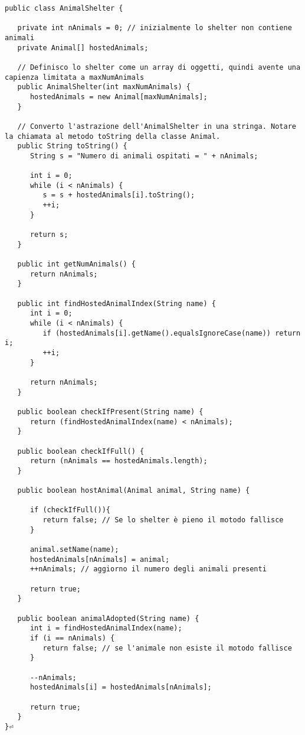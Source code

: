 \documentclass{article}
\begin{document}
\begin{lstlisting}[caption={AnimalShelter.java}]
	public class AnimalShelter {

   private int nAnimals = 0; // inizialmente lo shelter non contiene animali
   private Animal[] hostedAnimals;

   // Definisco lo shelter come un array di oggetti, quindi avente una capienza limitata a maxNumAnimals
   public AnimalShelter(int maxNumAnimals) {
      hostedAnimals = new Animal[maxNumAnimals];
   }

   // Converto l'astrazione dell'AnimalShelter in una stringa. Notare la chiamata al metodo toString della classe Animal.
   public String toString() {
      String s = "Numero di animali ospitati = " + nAnimals;

      int i = 0;
      while (i < nAnimals) {
         s = s + hostedAnimals[i].toString();
         ++i;
      }

      return s;
   }

   public int getNumAnimals() {
      return nAnimals;
   }

   public int findHostedAnimalIndex(String name) {
      int i = 0;
      while (i < nAnimals) {
         if (hostedAnimals[i].getName().equalsIgnoreCase(name)) return i;
         ++i;
      }

      return nAnimals;
   }

   public boolean checkIfPresent(String name) {
      return (findHostedAnimalIndex(name) < nAnimals);
   }

   public boolean checkIfFull() {
      return (nAnimals == hostedAnimals.length);
   }

   public boolean hostAnimal(Animal animal, String name) {

      if (checkIfFull()){
         return false; // Se lo shelter è pieno il motodo fallisce
      }

      animal.setName(name);
      hostedAnimals[nAnimals] = animal;
      ++nAnimals; // aggiorno il numero degli animali presenti

      return true;
   }

   public boolean animalAdopted(String name) {
      int i = findHostedAnimalIndex(name);
      if (i == nAnimals) {
         return false; // se l'animale non esiste il motodo fallisce
      }

      --nAnimals;
      hostedAnimals[i] = hostedAnimals[nAnimals];

      return true;
   }
}⏎  
\end{lstlisting}
\end{document}
